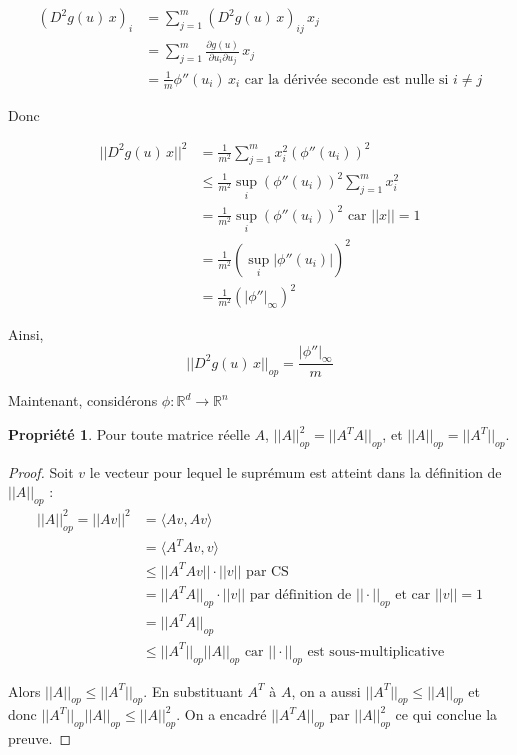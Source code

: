 \documentclass[a4paper, 11pt, french]{article}
\theoremstyle{definition}
\newtheorem{property}{Propriété}
\begin{document}
	\begin{align}
		(D^2 g(u) \, x)_i &= \sum_{j=1}^{m} (D^2 g(u) \, x)_{ij} \, x_j \\
		&= \sum_{j=1}^{m} \frac{\partial g(u)}{\partial u_i \partial u_j} \, x_j \\
		&= \frac{1}{m} \phi ''(u_i) \, x_i \text{ car la dérivée seconde est nulle si $i \neq j$}
	\end{align}
	
	Donc
	
	\begin{align*}
		||D^2 g(u) \, x||^2 &= \frac{1}{m^2} \sum_{j=1}^{m} x_i^2 (\phi ''(u_i))^2 \\
		&\leq \frac{1}{m^2} \sup_i (\phi ''(u_i))^2 \sum_{j=1}^{m} x_i^2 \\
		&= \frac{1}{m^2} \sup_i (\phi ''(u_i))^2 \text{ car $||x|| = 1$} \\
		&= \frac{1}{m^2} (\sup_i |\phi ''(u_i)|)^2 \\
		&= \frac{1}{m^2} (|\phi ''|_{\infty})^2
	\end{align*}
	
	Ainsi, \[||D^2 g(u) \, x||_{op} = \frac{|\phi ''|_{\infty}}{m}\]
	
	
	
	




	Maintenant, considérons $\phi : \mathbb{R}^d \to \mathbb{R}^n$ \\
	
	\begin{property}
		Pour toute matrice réelle $A$, $||A||_{op}^2 = ||A^T A||_{op}$, et $||A||_{op} = ||A^T||_{op}$.
	\end{property}
	\begin{proof}
		Soit $v$ le vecteur pour lequel le suprémum est atteint dans la définition de $||A||_{op}$ :
		\begin{align*}
			||A||_{op}^2 = ||Av||^2 &= \langle Av, Av \rangle \\
			&= \langle A^T Av, v \rangle \\
			&\leq ||A^T Av|| \cdot ||v|| \text{ par CS}\\
			&= ||A^T A||_{op} \cdot ||v|| \text{ par définition de $||\cdot||_{op}$ et car $||v|| = 1$}\\
			&= ||A^T A||_{op} \\
			&\leq ||A^T||_{op} ||A||_{op} \text{ car $||\cdot||_{op}$ est sous-multiplicative}
		\end{align*}
		
		Alors $||A||_{op} \leq ||A^T||_{op}$. En substituant $A^T$ à $A$, on a aussi $||A^T||_{op} \leq ||A||_{op}$ et donc $||A^T||_{op} ||A||_{op} \leq ||A||_{op}^2$. On a encadré $||A^T A||_{op}$ par $||A||_{op}^2$ ce qui conclue la preuve.
	
	\end{proof}
\end{document}
